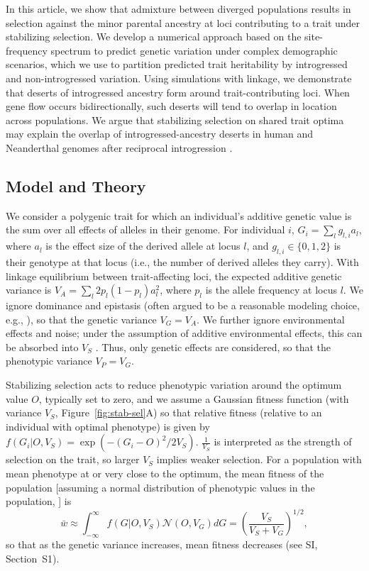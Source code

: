\documentclass[10pt,letterpaper]{article}
\begin{document}
In this article, we show that admixture between diverged populations results in
selection against the minor parental ancestry at loci contributing to a trait
under stabilizing selection. We develop a numerical approach based on the
site-frequency spectrum to predict genetic variation under complex demographic
scenarios, which we use to partition predicted trait heritability by
introgressed and non-introgressed variation. Using simulations with linkage, we
demonstrate that deserts of introgressed ancestry form around
trait-contributing loci. When gene flow occurs bidirectionally, such deserts
will tend to overlap in location across populations. We argue that stabilizing
selection on shared trait optima may explain the overlap of
introgressed-ancestry deserts in human and Neanderthal genomes after reciprocal
introgression \cite{harris2023diverse}.


\subsection*{Model and Theory}

We consider a polygenic trait for which an individual's additive genetic value
is the sum over all effects of alleles in their genome. For individual $i$,
\(G_i = \sum_l g_{l, i} a_l\), where $a_l$ is the effect size of the derived
allele at locus $l$, and \(g_{l,i}\in\{0,1,2\}\) is their genotype at that
locus (i.e., the number of derived alleles they carry). With linkage
equilibrium between trait-affecting loci, the expected additive genetic
variance is \(V_A = \sum_l 2p_l(1-p_l)a_l^2\), where $p_l$ is the allele
frequency at locus $l$. We ignore dominance and epistasis (often argued to be a
reasonable modeling choice, e.g., \cite{barton2002understanding,
zhang2002pleiotropic}), so that the genetic variance \(V_G = V_A\). We further
ignore environmental effects and noise; under the assumption of additive
environmental effects, this can be absorbed into $V_S$
\cite{lande1975maintenance, simons2018population}. Thus, only genetic effects
are considered, so that the phenotypic variance \(V_P=V_G\).

Stabilizing selection acts to reduce phenotypic variation around the optimum
value $O$, typically set to zero, and we assume a Gaussian fitness function
(with variance $V_S$, Figure~\ref{fig:stab-sel}A) so that relative fitness
(relative to an individual with optimal phenotype) is given by \(f(G_i | O,
V_S) = \exp{(-(G_i - O)^2 / 2 V_S)}\). $\frac{1}{V_S}$ is interpreted as the
strength of selection on the trait, so larger $V_S$ implies weaker selection.
For a population with mean phenotype at or very close to the optimum, the
mean fitness of the population [assuming a normal distribution of phenotypic
values in the population, \cite{turelli1994genetic, urban2013asymmetric}] is
\[\bar{w} \approx \int_{-\infty}^\infty
f(G | O, V_S) \mathcal{N}(O, V_G) dG =
\left(\frac{V_S}{V_S+V_G}\right)^{1/2},\]
so that as the genetic variance increases, mean fitness decreases (see
SI, Section~S1).
\end{document}
